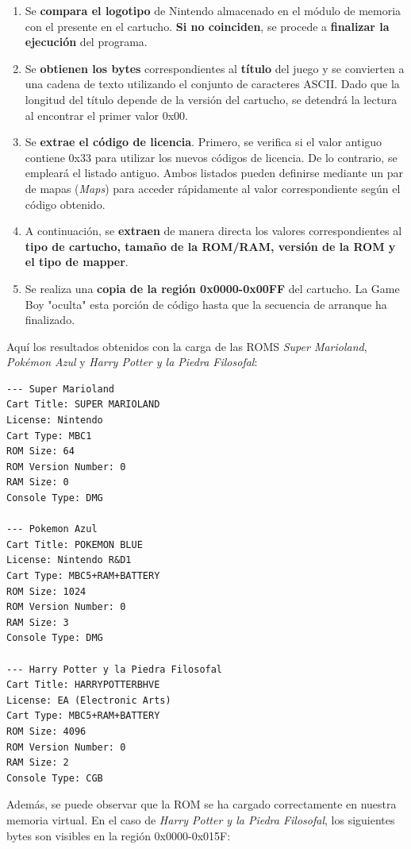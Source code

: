\begin{enumerate}
    \item Se \textbf{compara el logotipo} de Nintendo almacenado en el módulo de memoria con el presente en el cartucho. \textbf{Si no coinciden}, se procede a \textbf{finalizar la ejecución} del programa.
    \item Se \textbf{obtienen los bytes} correspondientes al \textbf{título} del juego y se convierten a una cadena de texto utilizando el conjunto de caracteres ASCII. Dado que la longitud del título depende de la versión del cartucho, se detendrá la lectura al encontrar el primer valor 0x00.
    \item Se \textbf{extrae el código de licencia}. Primero, se verifica si el valor antiguo contiene 0x33 para utilizar los nuevos códigos de licencia. De lo contrario, se empleará el listado antiguo. Ambos listados pueden definirse mediante un par de mapas (\textit{Maps}) para acceder rápidamente al valor correspondiente según el código obtenido.
    \item A continuación, se \textbf{extraen} de manera directa los valores correspondientes al \textbf{tipo de cartucho, tamaño de la ROM/RAM, versión de la ROM y el tipo de mapper}.
    \item Se realiza una \textbf{copia de la región 0x0000-0x00FF} del cartucho. La Game Boy "oculta" esta porción de código hasta que la secuencia de arranque ha finalizado.
\end{enumerate}

Aquí los resultados obtenidos con la carga de las ROMS \textit{Super Marioland}, \textit{Pokémon Azul} y \textit{Harry Potter y la Piedra Filosofal}:

\begin{lstlisting}[language=Consola, caption={Valores obtenidos tras la carga de ROM.}, label={code:romresults}]
--- Super Marioland
Cart Title: SUPER MARIOLAND
License: Nintendo
Cart Type: MBC1
ROM Size: 64
ROM Version Number: 0
RAM Size: 0
Console Type: DMG

--- Pokemon Azul
Cart Title: POKEMON BLUE
License: Nintendo R&D1
Cart Type: MBC5+RAM+BATTERY
ROM Size: 1024
ROM Version Number: 0
RAM Size: 3
Console Type: DMG

--- Harry Potter y la Piedra Filosofal
Cart Title: HARRYPOTTERBHVE
License: EA (Electronic Arts)
Cart Type: MBC5+RAM+BATTERY
ROM Size: 4096
ROM Version Number: 0
RAM Size: 2
Console Type: CGB
\end{lstlisting}

Además, se puede observar que la ROM se ha cargado correctamente en nuestra memoria virtual. En el caso de \textit{Harry Potter y la Piedra Filosofal}, los siguientes bytes son visibles en la región 0x0000-0x015F:

